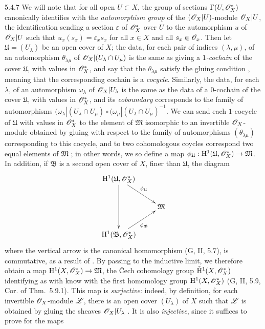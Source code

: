 \begin{env}{5.4.7}
We will note that for all open $U\subset X$, the group of sections $\Gamma(U,\mathscr{O}_X^*)$
canonically identifies with the \emph{automorphism group} of the $(\mathscr{O}_X|U)$-module
$\mathscr{O}_X|U$, the identification sending a section $\varepsilon$ of $\mathscr{O}_X^*$ over $U$ to the
automorphism $u$ of $\mathscr{O}_X|U$ such that $u_x(s_x)=\varepsilon_x s_x$ for all $x\in X$ and
all $s_x\in\mathscr{O}_x$. Then let $\mathfrak{U}=(U_\lambda)$ be an open cover of $X$; the data, for
each pair of indices $(\lambda,\mu)$, of an automorphism $\theta_{\lambda\mu}$ of
$\mathscr{O}_X|(U_\lambda\cap U_\mu)$ is the same as giving a \emph{$1$-cochain} of the cover
$\mathfrak{U}$, with values in $\mathscr{O}_X^*$, and say that the $\theta_{\lambda\mu}$ satisfy the
gluing condition , meaning that the corresponding cochain is a
\emph{cocycle}. Similarly, the data, for each $\lambda$, of an automorphism $\omega_\lambda$
of $\mathscr{O}_X|U_\lambda$ is the same as the data of a $0$-cochain of the cover $\mathfrak{U}$,
with values in $\mathscr{O}_X^*$, and its \emph{coboundary} corresponds to the family of
automorphisms
$(\omega_\lambda|(U_\lambda\cap U_\mu)\circ(\omega_\mu|(U_\lambda\cap U_\mu)^{-1}$. We can
send each $1$-cocycle of $\mathfrak{U}$ with values in $\mathscr{O}_X^*$ to the element of
$\mathfrak{M}$ isomorphic to an invertible $\mathscr{O}_X$-module obtained by gluing with respect to
the family of automorphisms $(\theta_{\lambda\mu})$ corresponding to this cocycle, and to
two cohomologous coycles correspond two equal elements of $\mathfrak{M}$ ;
in other words, we so define a map
$\phi_\mathfrak{U}:\mathrm{H}^1(\mathfrak{U},\mathscr{O}_X^*)\to\mathfrak{M}$. In addition, if
$\mathfrak{B}$ is a second open cover of $X$, finer than $\mathfrak{U}$, the diagram
\[
  \xymatrix{
    \HH^1(\mathfrak{U},\OO_X^*)\ar[rd]^{\vphi_\mathfrak{U}}\ar[dd]\\
    & \mathfrak{M}\\
    \HH^1(\mathfrak{B},\OO_X^*)\ar[ur]_{\vphi_\mathfrak{B}}
  }
\]
where the vertical arrow is the canonical homomorphism (G, II, 5.7), is commutative, as a
result of . By passing to the inductive limit, we therefore obtain a map
$\mathrm{H}^1(X,\mathscr{O}_X^*)\to\mathfrak{M}$, the \v Cech cohomology group $\check{\mathrm{H}}^1(X,\mathscr{O}_X^*)$
identifying as with know with the first homomology group $\mathrm{H}^1(X,\mathscr{O}_X^*)$
(G, II, 5.9, Cor. of Thm.~5.9.1). This map is \emph{surjective}: indeed, by definition, for
each invertible $\mathscr{O}_X$-module $\mathscr{L}$, there is an open cover $(U_\lambda)$ of $X$ such
that $\mathscr{L}$ is obtained by gluing the sheaves $\mathscr{O}_X|U_\lambda$ . It is
also \emph{injective}, since it suffices to prove for the maps

\end{env}
